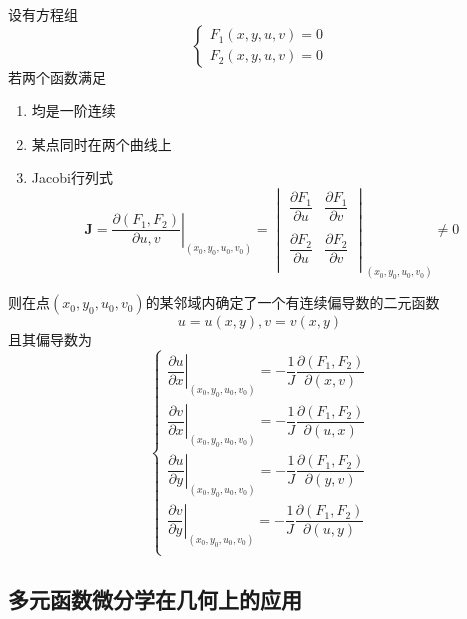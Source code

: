 \begin{theorem}
	设有方程组
	\begin{equation}\label{key}
		\begin{cases}
			F_1(x,y,u,v)=0\\
			F_2(x,y,u,v)=0
		\end{cases}
	\end{equation}
若两个函数满足
\begin{enumerate}
	\item 均是一阶连续
	\item 某点同时在两个曲线上
	\item Jacobi行列式
	\begin{equation}\label{key}
		\bm{J}=\left .\dfrac{\partial (F_1,F_2)}{\partial u,v}\right |_{(x_0,y_0,u_0,v_0)}=
		\begin{vmatrix}
			\dfrac{\partial F_1}{\partial u}&	\dfrac{\partial F_1}{\partial v}\\
			\\
				\dfrac{\partial F_2}{\partial u}&	\dfrac{\partial F_2}{\partial v}\\
		\end{vmatrix}_{(x_0,y_0,u_0,v_0)}
	\neq 0
	\end{equation}
\end{enumerate}
则在点$ (x_0,y_0,u_0,v_0) $的某邻域内确定了一个有连续偏导数的二元函数
\begin{equation}\label{key}
	u=u(x,y),v=v(x,y)
\end{equation}
且其偏导数为
\begin{equation}\label{key}
	\begin{cases}
		\left .\dfrac{\partial u}{\partial x}\right |_{(x_0,y_0,u_0,v_0)}=-\dfrac{1}{J}\dfrac{\partial (F_1,F_2)}{\partial (x,v)}\\
		\left .\dfrac{\partial v}{\partial x}\right |_{(x_0,y_0,u_0,v_0)}=-\dfrac{1}{J}\dfrac{\partial (F_1,F_2)}{\partial (u,x)}\\
		\left .\dfrac{\partial u}{\partial y}\right |_{(x_0,y_0,u_0,v_0)}=-\dfrac{1}{J}\dfrac{\partial (F_1,F_2)}{\partial (y,v)}\\
		\left .\dfrac{\partial v}{\partial y}\right |_{(x_0,y_0,u_0,v_0)}=-\dfrac{1}{J}\dfrac{\partial (F_1,F_2)}{\partial (u,y)}\\
	\end{cases}
\end{equation}
\end{theorem}

\subsection{多元函数微分学在几何上的应用}

